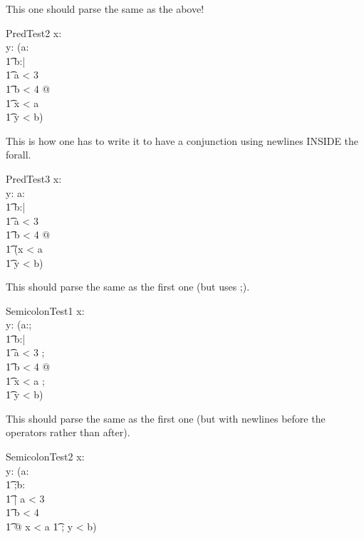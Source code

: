 \documentclass{article}
\begin{document}
This one should parse the same as the above!
\begin{schema}{PredTest2}
   x:\nat \\
   y:\nat
\where
   (\forall a:\nat \\
   \t1      b:\nat | \\
   \t1     a < 3 \\
   \t1     b < 4 @ \\
   \t1   x < a \\
   \t1   y < b)
\end{schema}

This is how one has to write it to have a conjunction using newlines
INSIDE the forall.
\begin{schema}{PredTest3}
   x:\nat \\
   y:\nat
\where
   \forall a:\nat \\
   \t1      b:\nat | \\
   \t1     a < 3 \\
   \t1     b < 4 @ \\
   \t1   (x < a \\
   \t1   y < b)
\end{schema}

This should parse the same as the first one (but uses ;).
\begin{schema}{SemicolonTest1}
   x:\nat \\
   y:\nat
\where
   (\forall a:\nat; \\
   \t1      b:\nat | \\
   \t1     a < 3 ; \\
   \t1     b < 4 @ \\
   \t1   x < a ; \\
   \t1   y < b)
\end{schema}

This should parse the same as the first one (but with newlines before
the operators rather than after).
\begin{schema}{SemicolonTest2}
   x:\nat \\
   y:\nat
\where
   (\forall a:\nat \\
   \t1      ;b:\nat \\
   \t1   | a < 3 \\
   \t1     b < 4 \\
   \t1   @ x < a
   \t1   ; y < b)
\end{schema}
\end{document}
